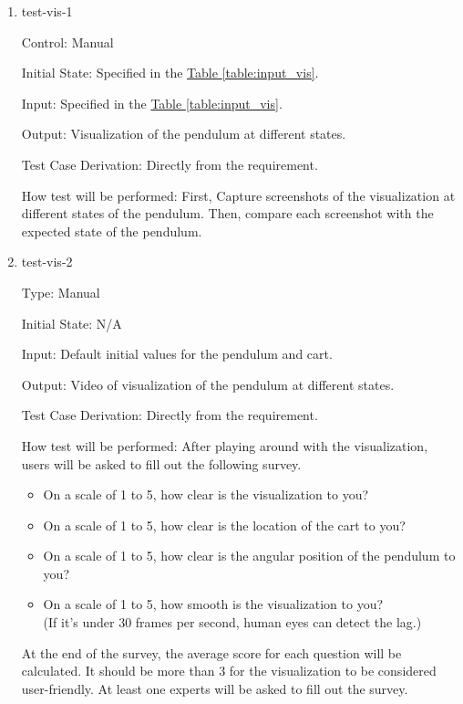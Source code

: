 \documentclass[12pt, titlepage]{article}
\begin{document}
\begin{enumerate}

\item{test-vis-1\\}

Control: Manual
					
Initial State: Specified in the \hyperref[table:input_vis]{Table \ref*{table:input_vis}}.
					
Input: Specified in the \hyperref[table:input_vis]{Table \ref*{table:input_vis}}.
					
Output: Visualization of the pendulum at different states.

Test Case Derivation: Directly from the requirement.
					
How test will be performed: First, Capture screenshots of the visualization 
at different states of the pendulum. Then, compare each screenshot with
the expected state of the pendulum.

\item{test-vis-2\\}

Type: Manual
					
Initial State: N/A
					
					
Input: Default initial values for the pendulum and cart.
					
Output: Video of visualization of the pendulum at different states.

Test Case Derivation: Directly from the requirement.

How test will be performed: After playing around with the visualization, 
users will be asked to fill out the following survey.

\begin{itemize}\renewcommand{\labelitemi}{\scriptsize$\square$}
  \item On a scale of 1 to 5, how clear is the visualization to you?
  \item On a scale of 1 to 5, how clear is the location of the cart to you?
  \item On a scale of 1 to 5, how clear is the angular position of the pendulum to you?
  \item On a scale of 1 to 5, how smooth is the visualization to you? \\
        (If it's under 30 frames per second, human eyes can detect the lag.)
\end{itemize}
At the end of the survey, the average score for each question will be calculated.
It should be more than 3 for the visualization to be considered user-friendly.
At least one experts will be asked to fill out the survey.


\end{enumerate}
\end{document}

